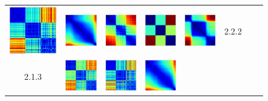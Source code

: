 \documentclass[bachelor, nocolorlinks, printoneside]{seuthesis} %
\begin{document}
\begin{Main}
\begin{figure}[ht!]
\begin{centering}
\begin{tabular}{cccc|cccc}
        \includegraphics[width=0.12\columnwidth,keepaspectratio]{figs/toy_triangle/cluster_converge_3by30_2_2.png} &
        \includegraphics[width=0.12\columnwidth,keepaspectratio]{figs/toy_triangle/cluster_converge_3by30_2_3.png} &  
        \includegraphics[width=0.12\columnwidth,keepaspectratio]{figs/toy_triangle/cluster_converge_3by16_2_1.png} &
        \includegraphics[width=0.12\columnwidth,keepaspectratio]{figs/toy_triangle/cluster_converge_3by16_2_2.png} &
        \includegraphics[width=0.12\columnwidth,keepaspectratio]{figs/toy_triangle/cluster_converge_3by16_2_3.png}& 2.2.2\\
        2.1.3 &\includegraphics[width=0.12\columnwidth,keepaspectratio]{figs/toy_triangle/cluster_converge_3by30_3_1.png} &
        \includegraphics[width=0.12\columnwidth,keepaspectratio]{figs/toy_triangle/cluster_converge_3by30_3_2.png} &
        \includegraphics[width=0.12\columnwidth,keepaspectratio]{figs/toy_triangle/cluster_converge_3by30_3_3.png} &  

\end{tabular}
\end{centering}
\end{figure}
\end{Main}
\end{document}
